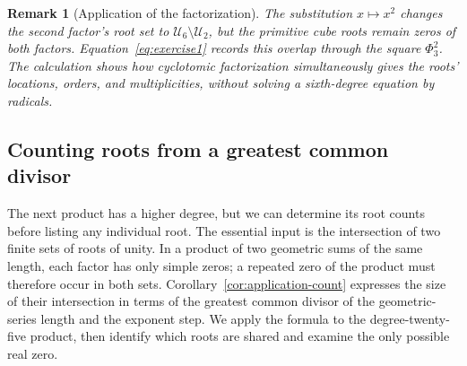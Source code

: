 \documentclass[11pt,a4paper]{article}
\numberwithin{equation}{section}
\theoremstyle{uprightpaper}
\newtheorem{remark}{Remark}[section]
\begin{document}
\begin{remark}[Application of the factorization]\label{rem:exercise-one}
The substitution $x\mapsto x^2$ changes the second factor's root set to $\mathcal U_6\setminus\mathcal U_2$, but the primitive cube roots remain zeros of both factors. Equation~\eqref{eq:exercise1} records this overlap through the square $\Phi_3^2$. The calculation shows how cyclotomic factorization simultaneously gives the roots' locations, orders, and multiplicities, without solving a sixth-degree equation by radicals.
\end{remark}

\subsection{Counting roots from a greatest common divisor}\label{subsec:exercise-two}

The next product has a higher degree, but we can determine its root counts before listing any individual root. The essential input is the intersection of two finite sets of roots of unity. In a product of two geometric sums of the same length, each factor has only simple zeros; a repeated zero of the product must therefore occur in both sets. Corollary~\ref{cor:application-count} expresses the size of their intersection in terms of the greatest common divisor of the geometric-series length and the exponent step. We apply the formula to the degree-twenty-five product, then identify which roots are shared and examine the only possible real zero.
\end{document}
